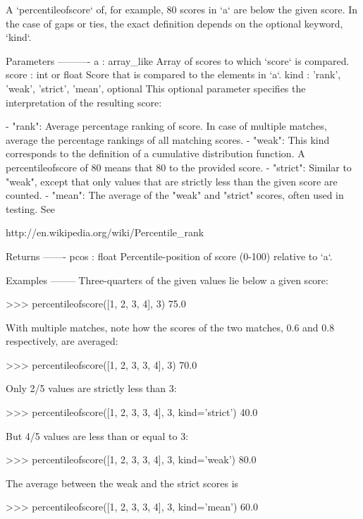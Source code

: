 \begin{DoxyVerb}
\begin{DoxyVerb}
A `percentileofscore` of, for example, 80%
scores in `a` are below the given score. In the case of gaps or
ties, the exact definition depends on the optional keyword, `kind`.

Parameters
----------
a : array_like
    Array of scores to which `score` is compared.
score : int or float
    Score that is compared to the elements in `a`.
kind : {'rank', 'weak', 'strict', 'mean'}, optional
    This optional parameter specifies the interpretation of the
    resulting score:

    - "rank": Average percentage ranking of score.  In case of
              multiple matches, average the percentage rankings of
              all matching scores.
    - "weak": This kind corresponds to the definition of a cumulative
              distribution function.  A percentileofscore of 80%
              means that 80%
              to the provided score.
    - "strict": Similar to "weak", except that only values that are
                strictly less than the given score are counted.
    - "mean": The average of the "weak" and "strict" scores, often used in
              testing.  See

              http://en.wikipedia.org/wiki/Percentile_rank

Returns
-------
pcos : float
    Percentile-position of score (0-100) relative to `a`.

Examples
--------
Three-quarters of the given values lie below a given score:

>>> percentileofscore([1, 2, 3, 4], 3)
75.0

With multiple matches, note how the scores of the two matches, 0.6
and 0.8 respectively, are averaged:

>>> percentileofscore([1, 2, 3, 3, 4], 3)
70.0

Only 2/5 values are strictly less than 3:

>>> percentileofscore([1, 2, 3, 3, 4], 3, kind='strict')
40.0

But 4/5 values are less than or equal to 3:

>>> percentileofscore([1, 2, 3, 3, 4], 3, kind='weak')
80.0

The average between the weak and the strict scores is

>>> percentileofscore([1, 2, 3, 3, 4], 3, kind='mean')
60.0\end{DoxyVerb}
 \hypertarget{namespacescipy_1_1stats_1_1stats_ab33df19284919454cbde0baf361d2287}{}

\end{DoxyVerb}
